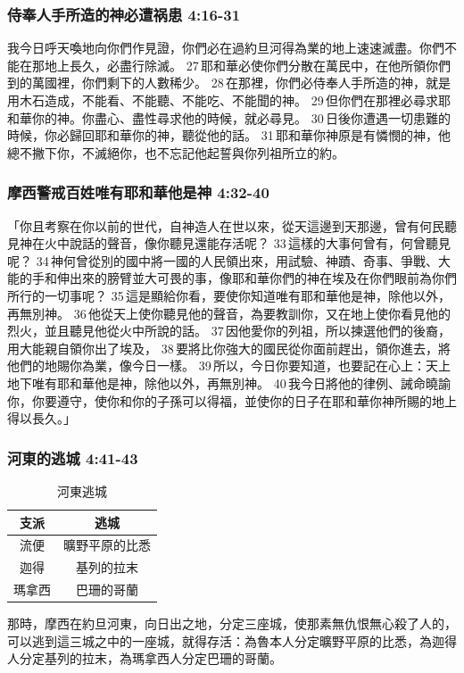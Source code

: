 \subsubsection{侍奉人手所造的神必遭祸患 4:16-31}
我今日呼天喚地向你們作見證，你們必在過約旦河得為業的地上速速滅盡。你們不能在那地上長久，必盡行除滅。 27 耶和華必使你們分散在萬民中，在他所領你們到的萬國裡，你們剩下的人數稀少。 28 在那裡，你們必侍奉人手所造的神，就是用木石造成，不能看、不能聽、不能吃、不能聞的神。 29 但你們在那裡必尋求耶和華你的神。你盡心、盡性尋求他的時候，就必尋見。 30 日後你遭遇一切患難的時候，你必歸回耶和華你的神，聽從他的話。 31 耶和華你神原是有憐憫的神，他總不撇下你，不滅絕你，也不忘記他起誓與你列祖所立的約。

\subsubsection{摩西警戒百姓唯有耶和華他是神 4:32-40}
「你且考察在你以前的世代，自神造人在世以來，從天這邊到天那邊，曾有何民聽見神在火中說話的聲音，像你聽見還能存活呢？ 33 這樣的大事何曾有，何曾聽見呢？ 34 神何曾從別的國中將一國的人民領出來，用試驗、神蹟、奇事、爭戰、大能的手和伸出來的膀臂並大可畏的事，像耶和華你們的神在埃及在你們眼前為你們所行的一切事呢？ 35 這是顯給你看，要使你知道唯有耶和華他是神，除他以外，再無別神。 36 他從天上使你聽見他的聲音，為要教訓你，又在地上使你看見他的烈火，並且聽見他從火中所說的話。 37 因他愛你的列祖，所以揀選他們的後裔，用大能親自領你出了埃及， 38 要將比你強大的國民從你面前趕出，領你進去，將他們的地賜你為業，像今日一樣。 39 所以，今日你要知道，也要記在心上：天上地下唯有耶和華他是神，除他以外，再無別神。 40 我今日將他的律例、誡命曉諭你，你要遵守，使你和你的子孫可以得福，並使你的日子在耶和華你神所賜的地上得以長久。」


\subsubsection{河東的逃城 4:41-43}
\begin{table}
\vspace*{-14mm}
\centering
\begin{tabular}{|c|c|}\hline\hline
支派 & 逃城   \\\hline
流便& 曠野平原的比悉    \\\hline
迦得&  基列的拉末 \\\hline
瑪拿西   &巴珊的哥蘭 \\\hline
\end{tabular}
\caption{河東逃城}
\end{table}
那時，摩西在約旦河東，向日出之地，分定三座城，使那素無仇恨無心殺了人的，可以逃到這三城之中的一座城，就得存活：為魯本人分定曠野平原的比悉，為迦得人分定基列的拉末，為瑪拿西人分定巴珊的哥蘭。


